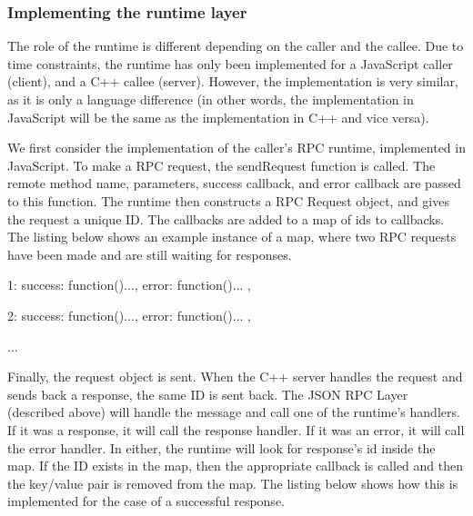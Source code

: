 \subsubsection{Implementing the runtime layer} %
\label{ssub:implementing_the_runtime_layer}
The role of the runtime is different depending on the caller and the callee. Due to time constraints, the runtime has only been implemented for a JavaScript caller (client), and a C++ callee (server). However, the implementation is very similar, as it is only a language difference (in other words, the implementation in JavaScript will be the same as the implementation in C++ and vice versa).

We first consider the implementation of the caller's RPC runtime, implemented in JavaScript. To make a RPC request, the sendRequest function is called. The remote method name, parameters, success callback, and error callback are passed to this function. The runtime then constructs a RPC Request object, and gives the request a unique ID. The callbacks are added to a map of ids to callbacks. The listing below shows an example instance of a map, where two RPC requests have been made and are still waiting for responses.

\begin{code}
{
  1: {
    success: function(){...},
    error: function(){...}
  },  

  2: {
    success: function(){...},
    error: function(){...}
  },  

  ...
}
\end{code}


Finally, the request object is sent. When the C++ server handles the request and sends back a response, the same ID is sent back. The JSON RPC Layer (described above) will handle the message and call one of the runtime's handlers. If it was a response, it will call the response handler. If it was an error, it will call the error handler. In either, the runtime will look for response's id inside the map. If the ID exists in the map, then the appropriate callback is called and then the key/value pair is removed from the map. The listing below shows how this is implemented for the case of a successful response.

